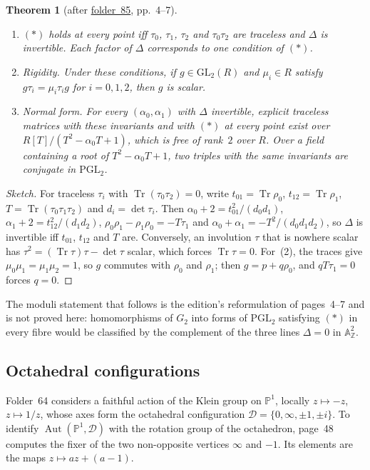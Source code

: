 \documentclass[11pt,a4paper]{amsart}
\newtheorem{theorem}{Theorem}[section]
\theoremstyle{definition}
\theoremstyle{remark}
\newcommand{\Z}{\mathbb Z}
\newcommand{\PP}{\mathbb P^1}
\newcommand{\PGL}{\mathrm{PGL}_2}
\newcommand{\GL}{\mathrm{GL}_2}
\newcommand{\Tr}{\operatorname{Tr}}
\newcommand{\fac}[1]{\href{https://grothendieck.umontpellier.fr/#1.pdf}{folder~#1}}
\begin{document}
\begin{theorem}[after \fac{85}, pp.~4--7]\label{thm:g2}
\leavevmode
\begin{enumerate}
\item $(*)$ holds at every point iff $\tau_0$, $\tau_1$, $\tau_2$ and $\tau_0\tau_2$ are traceless and $\Delta$ is invertible. Each factor of $\Delta$ corresponds to one condition of $(*)$.
\item \emph{Rigidity.} Under these conditions, if $g \in \GL(R)$ and $\mu_i \in R$ satisfy $g\tau_i = \mu_i\tau_ig$ for $i = 0, 1, 2$, then $g$ is scalar.
\item \emph{Normal form.} For every $(\alpha_0, \alpha_1)$ with $\Delta$ invertible, explicit traceless matrices with these invariants and with $(*)$ at every point exist over $R[T]/(T^2 - \alpha_0T + 1)$, which is free of rank~$2$ over $R$. Over a field containing a root of $T^2 - \alpha_0T + 1$, two triples with the same invariants are conjugate in $\PGL$.
\end{enumerate}
\end{theorem}

\begin{proof}[Sketch]
For traceless $\tau_i$ with $\Tr(\tau_0\tau_2) = 0$, write $t_{01} = \Tr\rho_0$, $t_{12} = \Tr\rho_1$, $T = \Tr(\tau_0\tau_1\tau_2)$ and $d_i = \det\tau_i$. Then $\alpha_0 + 2 = t_{01}^2/(d_0d_1)$, $\alpha_1 + 2 = t_{12}^2/(d_1d_2)$, $\rho_0\rho_1 - \rho_1\rho_0 = -T\tau_1$ and $\alpha_0 + \alpha_1 = -T^2/(d_0d_1d_2)$, so $\Delta$ is invertible iff $t_{01}$, $t_{12}$ and $T$ are. Conversely, an involution $\tau$ that is nowhere scalar has $\tau^2 = (\Tr\tau)\tau - \det\tau$ scalar, which forces $\Tr\tau = 0$. For~(2), the traces give $\mu_0\mu_1 = \mu_1\mu_2 = 1$, so $g$ commutes with $\rho_0$ and $\rho_1$; then $g = p + q\rho_0$, and $qT\tau_1 = 0$ forces $q = 0$.
\end{proof}

The moduli statement that follows is the edition's reformulation of pages~4--7 and is not proved here: homomorphisms of $G_2$ into forms of $\PGL$ satisfying $(*)$ in every fibre would be classified by the complement of the three lines $\Delta = 0$ in $\mathbb A^2_\Z$.

\subsection*{Octahedral configurations}
Folder~64 considers a faithful action of the Klein group on $\PP$, locally $z \mapsto -z$, $z \mapsto 1/z$, whose axes form the octahedral configuration $\mathcal{D} = \{0, \infty, \pm1, \pm i\}$. To identify $\operatorname{Aut}(\PP, \mathcal{D})$ with the rotation group of the octahedron, page~48 computes the fixer of the two non-opposite vertices $\infty$ and $-1$. Its elements are the maps $z \mapsto az + (a - 1)$.
\end{document}
